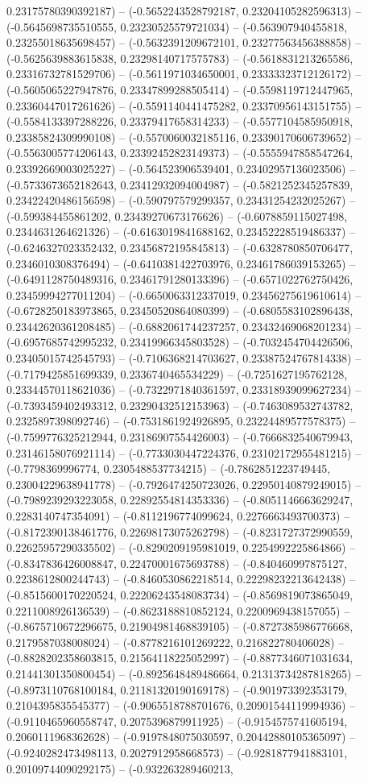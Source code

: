 0.23175780390392187) -- (-0.5652243528792187, 0.23204105282596313) -- (-0.5645698735510555, 0.23230525579721034) -- (-0.563907940455818, 0.23255018635698457) -- (-0.5632391209672101, 0.23277563456388858) -- (-0.5625639883615838, 0.23298140717575783) -- (-0.5618831213265586, 0.23316732781529706) -- (-0.5611971034650001, 0.23333323712126172) -- (-0.5605065227947876, 0.23347899288505414) -- (-0.5598119712447965, 0.23360447017261626) -- (-0.5591140441475282, 0.23370956143151755) -- (-0.5584133397288226, 0.23379417658314233) -- (-0.5577104585950918, 0.23385824309990108) -- (-0.5570060032185116, 0.23390170606739652) -- (-0.5563005774206143, 0.23392452823149373) -- (-0.5555947858547264, 0.23392669003025227) -- (-0.564523906539401, 0.23402957136023506) -- (-0.5733673652182643, 0.23412932094004987) -- (-0.5821252345257839, 0.23422420486156598) -- (-0.590797579299357, 0.23431254232025267) -- (-0.599384455861202, 0.23439270673176626) -- (-0.6078859115027498, 0.2344631264621326) -- (-0.6163019841688162, 0.23452228519486337) -- (-0.6246327023352432, 0.23456872195845813) -- (-0.6328780850706477, 0.2346010308376494) -- (-0.6410381422703976, 0.23461786039153265) -- (-0.6491128750489316, 0.23461791280133396) -- (-0.6571022762750426, 0.23459994277011204) -- (-0.6650063312337019, 0.23456275619610614) -- (-0.6728250183973865, 0.23450520864080399) -- (-0.6805583102896438, 0.23442620361208485) -- (-0.6882061744237257, 0.23432469068201234) -- (-0.6957685742995232, 0.23419966345803528) -- (-0.7032454704426506, 0.23405015742545793) -- (-0.7106368214703627, 0.23387524767814338) -- (-0.7179425851699339, 0.2336740465534229) -- (-0.7251627195762128, 0.23344570118621036) -- (-0.7322971840361597, 0.23318939099627234) -- (-0.7393459402493312, 0.23290432512153963) -- (-0.7463089532743782, 0.2325897398092746) -- (-0.7531861924926895, 0.23224489577578375) -- (-0.7599776325212944, 0.23186907554426003) -- (-0.7666832540679943, 0.23146158076921114) -- (-0.7733030447224376, 0.23102172955481215) -- (-0.7798369996774, 0.2305488537734215) -- (-0.7862851223749445, 0.23004229638941778) -- (-0.7926474250723026, 0.22950140879249015) -- (-0.7989239293223058, 0.22892554814353336) -- (-0.8051146663629247, 0.2283140747354091) -- (-0.8112196774099624, 0.2276663493700373) -- (-0.8172390138461776, 0.22698173075262798) -- (-0.8231727372990559, 0.22625957290335502) -- (-0.8290209195981019, 0.2254992225864866) -- (-0.8347836426008847, 0.22470001675693788) -- (-0.840460997875127, 0.2238612800244743) -- (-0.8460530862218514, 0.22298232213642438) -- (-0.8515600170220524, 0.22206243548083734) -- (-0.8569819073865049, 0.2211008926136539) -- (-0.8623188810852124, 0.2200969438157055) -- (-0.8675710672296675, 0.21904981468839105) -- (-0.8727385986776668, 0.2179587038008024) -- (-0.8778216101269222, 0.216822780406028) -- (-0.8828202358603815, 0.21564118225052997) -- (-0.8877346071031634, 0.21441301350800454) -- (-0.8925648489486664, 0.21313734287818265) -- (-0.8973110768100184, 0.21181320190169178) -- (-0.901973392353179, 0.2104395835545377) -- (-0.9065518788701676, 0.20901544119994936) -- (-0.9110465960558747, 0.2075396879911925) -- (-0.9154575741605194, 0.2060111968362628) -- (-0.9197848075030597, 0.20442880105365097) -- (-0.9240282473498113, 0.2027912958668573) -- (-0.9281877941883101, 0.20109744090292175) -- (-0.932263289460213, 